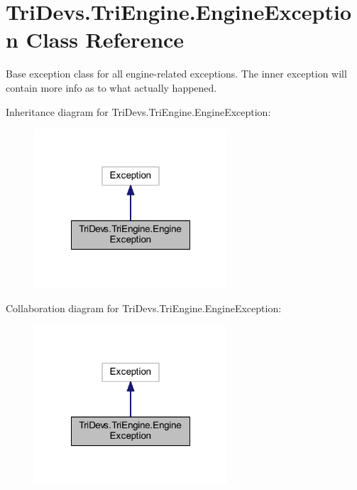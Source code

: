 \hypertarget{class_tri_devs_1_1_tri_engine_1_1_engine_exception}{\section{Tri\-Devs.\-Tri\-Engine.\-Engine\-Exception Class Reference}
\label{class_tri_devs_1_1_tri_engine_1_1_engine_exception}
}


Base exception class for all engine-\/related exceptions. The inner exception will contain more info as to what actually happened.  




Inheritance diagram for Tri\-Devs.\-Tri\-Engine.\-Engine\-Exception\-:
\nopagebreak
\begin{figure}[H]
\begin{center}
\leavevmode
\includegraphics[width=204pt]{class_tri_devs_1_1_tri_engine_1_1_engine_exception__inherit__graph}
\end{center}
\end{figure}


Collaboration diagram for Tri\-Devs.\-Tri\-Engine.\-Engine\-Exception\-:
\nopagebreak
\begin{figure}[H]
\begin{center}
\leavevmode
\includegraphics[width=204pt]{class_tri_devs_1_1_tri_engine_1_1_engine_exception__coll__graph}
\end{center}
\end{figure}


